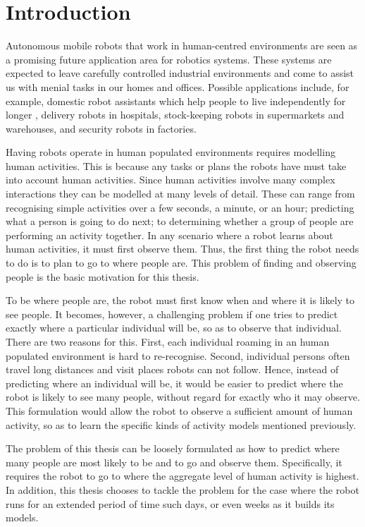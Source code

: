 \section{Introduction}
\label{sec:introduction}

Autonomous mobile robots that work in human-centred environments are seen as a promising future application area for robotics systems. These systems are expected to leave carefully controlled industrial environments and come to assist us with menial tasks in our homes and offices. Possible applications include, for example, domestic robot assistants which help people to live independently for longer \cite{5751968}, delivery robots in hospitals, stock-keeping robots in supermarkets and warehouses, and security robots in factories.

Having robots operate in human populated environments requires modelling human activities. This is because any tasks or plans the robots have must take into account human activities. Since human activities involve many complex interactions they can be modelled at many levels of detail. These can range from recognising simple activities over a few seconds, a minute, or an hour; predicting what a person is going to do next; to determining whether a group of people are performing an activity together. In any scenario where a robot learns about human activities, it must first observe them. Thus, the first thing the robot needs to do is to plan to go to where people are. This problem of finding and observing people is the basic motivation for this thesis.  

To be where people are, the robot must first know when and where it is likely to see people. It becomes, however, a challenging problem if one tries to predict exactly where a particular individual will be, so as to observe that individual. There are two reasons for this. First, each individual roaming in an human populated environment is hard to re-recognise. Second, individual persons often travel long distances and visit places robots can not follow. Hence, instead of predicting where an individual will be, it would be easier to predict where the robot is likely to see many people, without regard for exactly who it may observe. This formulation would allow the robot to observe a sufficient amount of human activity, so as to learn the specific kinds of activity models mentioned previously.

The problem of this thesis can be loosely formulated as how to predict where many people are most likely to be and to go and observe them. Specifically, it requires the robot to go to where the aggregate level of human activity is highest. In addition, this thesis chooses to tackle the problem for the case where the robot runs for an extended period of time such days, or even weeks as it builds its models.

